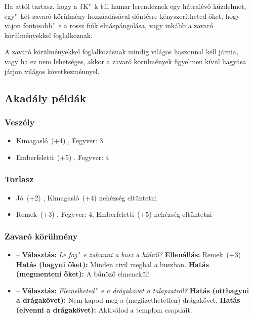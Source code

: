 Ha attól tartasz, hogy a JK"~k túl hamar lerendeznek egy hátralévő küzdelmet, egy"~két zavaró körülmény hozzáadásával döntésre kényszerítheted őket, hogy vajon fontosabb"~e a rossz fiúk elnáspángolása, vagy inkább a zavaró körülményekkel foglalkoznak.

A zavaró körülményekkel foglalkozásnak mindig világos haszonnal kell járnia, vagy ha ez nem lehetséges, akkor a zavaró körülmények figyelmen kívül hagyása járjon világos következménnyel.

\subsection{Akadály példák}

\subsubsection{Veszély}

\begin{itemize}
    \item Kimagasló~(+4) , Fegyver: 3
    \item Emberfeletti~(+5) , Fegyver: 4
\end{itemize}

\subsubsection{Torlasz}

\begin{itemize}
    \item Jó~(+2) , Kimagasló~(+4) nehézség eltüntetni
    \item Remek~(+3) , Fegyver: 4, Emberfeletti~(+5) nehézség eltüntetni
\end{itemize}

\subsubsection{Zavaró körülmény}

\begin{itemize}
    \item {} -- \textbf{Választás:} \textit{Le fog"~e zuhanni a busz a hídról?}
    \newline
    \textbf{Ellenállás:} Remek~(+3)
    \newline
    \textbf{Hatás (hagyni őket):} Minden civil meghal a buszban.
    \newline
    \textbf{Hatás (megmenteni őket):} A bűnöző elmenekül!
\end{itemize}

\begin{itemize}
    \item {} -- \textbf{Választás:} \textit{Elemelheted"~e a drágakövet a talapzatról?}
    \newline
    \textbf{Hatás (otthagyni a drágakövet):} Nem kapod meg a (megfizethetetlen) drágakövet.
    \newline
    \textbf{Hatás (elvenni a drágakövet):} Aktiválod a templom csapdáit.
\end{itemize}

